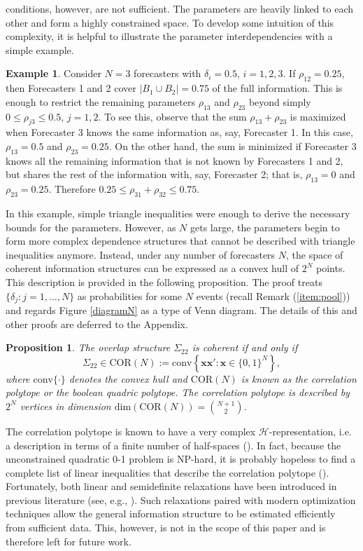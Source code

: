 \documentclass[11pt]{article}
\newtheorem{proposition}[theorem]{Proposition}
\theoremstyle{definition}
\newtheorem{example}[theorem]{Example}
\theoremstyle{definition}
\begin{document}
conditions, however, are not sufficient. The parameters are heavily linked to each other and form a highly constrained space. To develop some intuition of this complexity, it is helpful to illustrate the parameter interdependencies with a simple example. 
\begin{example}
Consider $N = 3$ forecasters with $\delta_i =  0.5$, $i = 1, 2, 3$.  If $\rho_{12} = 0.25$, then Forecasters 1 and 2 cover $|B_1 \cup B_2| = 0.75$ of the full information. This is enough to restrict the remaining parameters $\rho_{13}$ and $\rho_{23}$ beyond simply $0 \leq \rho_{j3} \leq 0.5$, $j = 1, 2$. To see this, observe that the sum $\rho_{13} + \rho_{23}$ is maximized when Forecaster 3 knows the same information as, say, Forecaster 1. In this case, $\rho_{13} = 0.5$ and  $\rho_{23} = 0.25$. On the other hand, the sum is minimized if Forecaster 3 knows all the remaining information that is not known by Forecasters 1 and 2, but shares the rest of the information with, say, Forecaster 2; that is, $\rho_{13} = 0$ and $\rho_{23} = 0.25$. Therefore  $0.25 \leq \rho_{31} + \rho_{32} \leq 0.75$. 
\end{example}
In this example, simple triangle inequalities were enough to derive the necessary bounds for the parameters. However, as $N$ gets large, the parameters begin to form more complex dependence structures that cannot be described with triangle inequalities anymore. Instead, under any number of forecasters $N$, the space of coherent information structures can be expressed as a convex hull of $2^N$ points. This description is provided in the following proposition. The proof treats $\{\delta_j : j = 1, \dots,
N\}$ as probabilities for some $N$ events (recall Remark
(\ref{item:pool})) and regards Figure \ref{diagramN} as a type of Venn
diagram. The details of this and other proofs are deferred to the
Appendix.

\begin{proposition}
\label{CorrelationPolytope}
The overlap structure $\Sigma_{22}$ is coherent if and only
if $$\Sigma_{22} \in \text{COR}(N) := \text{conv}\left\{
\boldsymbol{x}\boldsymbol{x}' : \boldsymbol{x} \in
\{0,1\}^N\right\},$$ where $\text{conv}\{\cdot\}$ denotes the convex hull and $\text{COR}(N)$ is known as the correlation
polytope or the boolean quadric polytope. The correlation polytope is described by $2^N$
vertices in dimension $\text{dim}(\text{COR}(N)) = \binom{N+1}{2}$.
\end{proposition}
The correlation polytope is known to have a very complex
$\mathcal{H}$-representation, i.e. a description in terms of a finite
number of half-spaces (\citealt{padberg1989boolean, ziegler2000lectures}). In fact, because the unconstrained quadratic
0-1 problem is NP-hard, it is probably hopeless to find a complete
list of linear inequalities that describe the correlation polytope
(\citealt{deza1997geometry}). Fortunately, both linear and semidefinite relaxations have been introduced in previous literature (see, e.g., \citealt{laurent1997connections}). Such relaxations paired with modern optimization techniques allow the general information structure to be estimated efficiently from sufficient data. This, however, is not in the scope of this paper and is therefore left for future work. 
\end{document}
